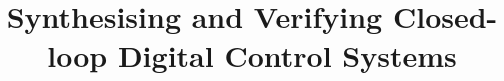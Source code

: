 \documentclass{sig-alternate-05-2015}
\begin{document}

\doi{}

\isbn{}

%

\title{Synthesising and Verifying Closed-loop Digital Control Systems}
%
%
%
%
%
\end{document}
